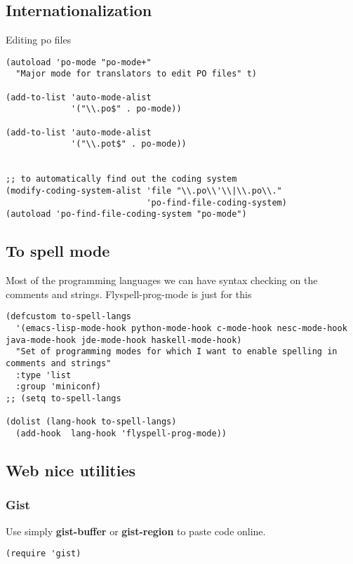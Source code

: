 \documentclass[11pt]{article}
\begin{document}
\subsection{Internationalization}
\label{sec-31.1}

   Editing po files
\begin{verbatim}
(autoload 'po-mode "po-mode+"
  "Major mode for translators to edit PO files" t)

(add-to-list 'auto-mode-alist
             '("\\.po$" . po-mode))

(add-to-list 'auto-mode-alist
             '("\\.pot$" . po-mode))


;; to automatically find out the coding system
(modify-coding-system-alist 'file "\\.po\\'\\|\\.po\\."
                            'po-find-file-coding-system)
(autoload 'po-find-file-coding-system "po-mode")
\end{verbatim}
\subsection{To spell mode}
\label{sec-31.2}

   Most of the programming languages we can have syntax checking on the comments and strings.
   Flyspell-prog-mode is just for this
\begin{verbatim}
(defcustom to-spell-langs
  '(emacs-lisp-mode-hook python-mode-hook c-mode-hook nesc-mode-hook java-mode-hook jde-mode-hook haskell-mode-hook)
  "Set of programming modes for which I want to enable spelling in comments and strings"
  :type 'list
  :group 'miniconf)
;; (setq to-spell-langs

(dolist (lang-hook to-spell-langs)
  (add-hook  lang-hook 'flyspell-prog-mode))
\end{verbatim}
\subsection{Web nice utilities}
\label{sec-31.3}
\subsubsection{Gist}
\label{sec-31.3.1}

    Use simply \textbf{gist-buffer} or \textbf{gist-region} to paste code online.
\begin{verbatim}
(require 'gist)
\end{verbatim}
\end{document}
